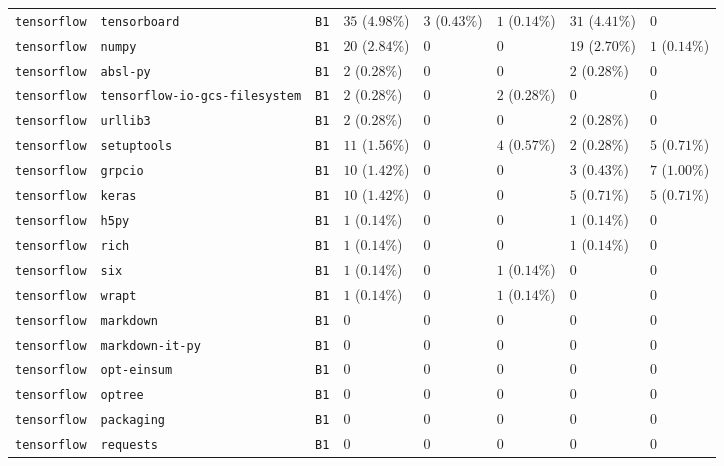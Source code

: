 \begin{table}
\begin{tabular}{llllllll}
\texttt{tensorflow} & \texttt{tensorboard} & \texttt{B1} & $35$ ($4.98\%$) & $3$ ($0.43\%$) & $1$ ($0.14\%$) & $31$ ($4.41\%$) & $0$ \\
\texttt{tensorflow} & \texttt{numpy} & \texttt{B1} & $20$ ($2.84\%$) & $0$ & $0$ & $19$ ($2.70\%$) & $1$ ($0.14\%$) \\
\texttt{tensorflow} & \texttt{absl-py} & \texttt{B1} & $2$ ($0.28\%$) & $0$ & $0$ & $2$ ($0.28\%$) & $0$ \\
\texttt{tensorflow} & \texttt{tensorflow-io-gcs-filesystem} & \texttt{B1} & $2$ ($0.28\%$) & $0$ & $2$ ($0.28\%$) & $0$ & $0$ \\
\texttt{tensorflow} & \texttt{urllib3} & \texttt{B1} & $2$ ($0.28\%$) & $0$ & $0$ & $2$ ($0.28\%$) & $0$ \\
\texttt{tensorflow} & \texttt{setuptools} & \texttt{B1} & $11$ ($1.56\%$) & $0$ & $4$ ($0.57\%$) & $2$ ($0.28\%$) & $5$ ($0.71\%$) \\
\texttt{tensorflow} & \texttt{grpcio} & \texttt{B1} & $10$ ($1.42\%$) & $0$ & $0$ & $3$ ($0.43\%$) & $7$ ($1.00\%$) \\
\texttt{tensorflow} & \texttt{keras} & \texttt{B1} & $10$ ($1.42\%$) & $0$ & $0$ & $5$ ($0.71\%$) & $5$ ($0.71\%$) \\
\texttt{tensorflow} & \texttt{h5py} & \texttt{B1} & $1$ ($0.14\%$) & $0$ & $0$ & $1$ ($0.14\%$) & $0$ \\
\texttt{tensorflow} & \texttt{rich} & \texttt{B1} & $1$ ($0.14\%$) & $0$ & $0$ & $1$ ($0.14\%$) & $0$ \\
\texttt{tensorflow} & \texttt{six} & \texttt{B1} & $1$ ($0.14\%$) & $0$ & $1$ ($0.14\%$) & $0$ & $0$ \\
\texttt{tensorflow} & \texttt{wrapt} & \texttt{B1} & $1$ ($0.14\%$) & $0$ & $1$ ($0.14\%$) & $0$ & $0$ \\
\texttt{tensorflow} & \texttt{markdown} & \texttt{B1} & $0$ & $0$ & $0$ & $0$ & $0$ \\
\texttt{tensorflow} & \texttt{markdown-it-py} & \texttt{B1} & $0$ & $0$ & $0$ & $0$ & $0$ \\
\texttt{tensorflow} & \texttt{opt-einsum} & \texttt{B1} & $0$ & $0$ & $0$ & $0$ & $0$ \\
\texttt{tensorflow} & \texttt{optree} & \texttt{B1} & $0$ & $0$ & $0$ & $0$ & $0$ \\
\texttt{tensorflow} & \texttt{packaging} & \texttt{B1} & $0$ & $0$ & $0$ & $0$ & $0$ \\
\texttt{tensorflow} & \texttt{requests} & \texttt{B1} & $0$ & $0$ & $0$ & $0$ & $0$ \\

\end{tabular}
\end{table}
